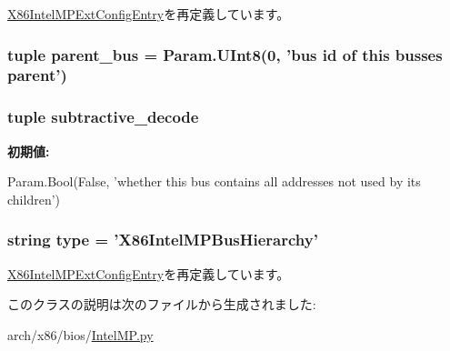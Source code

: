 \hyperlink{classIntelMP_1_1X86IntelMPExtConfigEntry_a17da7064bc5c518791f0c891eff05fda}{X86IntelMPExtConfigEntry}を再定義しています。\hypertarget{classIntelMP_1_1X86IntelMPBusHierarchy_a34c8718cbd13d47b1336836a4ff3b2d0}{
\subsubsection[{parent\_\-bus}]{\setlength{\rightskip}{0pt plus 5cm}tuple {\bf parent\_\-bus} = Param.UInt8(0, 'bus id of this busses parent')}}
\label{classIntelMP_1_1X86IntelMPBusHierarchy_a34c8718cbd13d47b1336836a4ff3b2d0}
\hypertarget{classIntelMP_1_1X86IntelMPBusHierarchy_af6e3e63ab843511d098d167740db1f68}{
\subsubsection[{subtractive\_\-decode}]{\setlength{\rightskip}{0pt plus 5cm}tuple {\bf subtractive\_\-decode}}}
\label{classIntelMP_1_1X86IntelMPBusHierarchy_af6e3e63ab843511d098d167740db1f68}
{\bfseries 初期値:}
\begin{DoxyCode}
Param.Bool(False,
            'whether this bus contains all addresses not used by its children')
\end{DoxyCode}
\hypertarget{classIntelMP_1_1X86IntelMPBusHierarchy_acce15679d830831b0bbe8ebc2a60b2ca}{
\subsubsection[{type}]{\setlength{\rightskip}{0pt plus 5cm}string {\bf type} = '{\bf X86IntelMPBusHierarchy}'}}
\label{classIntelMP_1_1X86IntelMPBusHierarchy_acce15679d830831b0bbe8ebc2a60b2ca}


\hyperlink{classIntelMP_1_1X86IntelMPExtConfigEntry_acce15679d830831b0bbe8ebc2a60b2ca}{X86IntelMPExtConfigEntry}を再定義しています。

このクラスの説明は次のファイルから生成されました:\begin{DoxyCompactItemize}
\item 
arch/x86/bios/\hyperlink{IntelMP_8py}{IntelMP.py}\end{DoxyCompactItemize}

